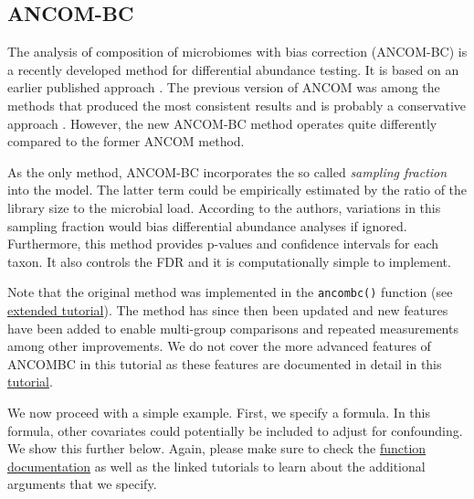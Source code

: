 \documentclass[
]{book}
\begin{document}
\hypertarget{ancom-bc}{%
\subsection{ANCOM-BC}\label{ancom-bc}}

The analysis of composition of microbiomes with bias correction
(ANCOM-BC) \citep{ancombc2020} is a recently developed method for differential
abundance testing. It is based on an earlier published approach
\citep{Mandal2015}. The previous version of ANCOM was among the methods
that produced the most consistent results and is probably a
conservative approach \citep{Nearing2022}. However, the new ANCOM-BC
method operates quite differently compared to the former ANCOM method.

As the only method, ANCOM-BC incorporates the so called \emph{sampling
fraction} into the model. The latter term could be empirically
estimated by the ratio of the library size to the microbial
load. According to the authors, variations in this sampling fraction
would bias differential abundance analyses if ignored. Furthermore,
this method provides p-values and confidence intervals for each
taxon. It also controls the FDR and it is computationally simple to
implement.

Note that the original method was implemented in the \texttt{ancombc()} function (see
\href{https://www.bioconductor.org/packages/release/bioc/vignettes/ANCOMBC/inst/doc/ANCOMBC.html}{extended tutorial}).
The method has since then been updated and new features have been added to enable
multi-group comparisons and repeated measurements among other improvements.
We do not cover the more advanced features of ANCOMBC in this tutorial
as these features are documented in detail in this
\href{https://www.bioconductor.org/packages/release/bioc/vignettes/ANCOMBC/inst/doc/ANCOMBC2.html}{tutorial}.

We now proceed with a simple example. First, we specify a formula. In this
formula, other covariates could potentially be included to adjust for
confounding. We show this further below. Again, please make sure to check the
\href{https://rdrr.io/github/FrederickHuangLin/ANCOMBC/man/ancombc.html}{function documentation}
as well as the linked tutorials to learn about the additional arguments
that we specify.
\end{document}
